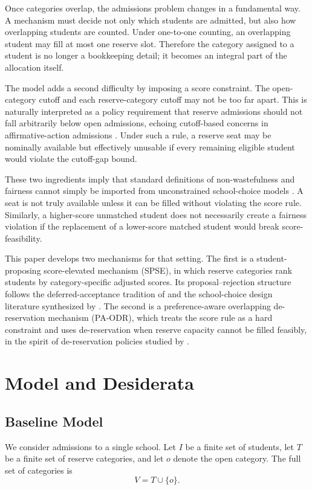 \documentclass[runningheads]{llncs}
\newcommand{\1}{\mathbf{1}}
\begin{document}
Once categories overlap, the admissions problem changes in a fundamental way. A mechanism must decide not only which students are admitted, but also how overlapping students are counted. Under one-to-one counting, an overlapping student may fill at most one reserve slot. Therefore the category assigned to a student is no longer a bookkeeping detail; it becomes an integral part of the allocation itself.

The model adds a second difficulty by imposing a score constraint. The open-category cutoff and each reserve-category cutoff may not be too far apart. This is naturally interpreted as a policy requirement that reserve admissions should not fall arbitrarily below open admissions, echoing cutoff-based concerns in affirmative-action admissions \cite{AyTu23a,ABB24a}. Under such a rule, a reserve seat may be nominally available but effectively unusable if every remaining eligible student would violate the cutoff-gap bound.

These two ingredients imply that standard definitions of non-wastefulness and fairness cannot simply be imported from unconstrained school-choice models \cite{EHYY14a,KHIY17a,GKK+17a}. A seat is not truly available unless it can be filled without violating the score rule. Similarly, a higher-score unmatched student does not necessarily create a fairness violation if the replacement of a lower-score matched student would break score-feasibility.

This paper develops two mechanisms for that setting. The first is a student-proposing score-elevated mechanism (SPSE), in which reserve categories rank students by category-specific adjusted scores. Its proposal--rejection structure follows the deferred-acceptance tradition of \cite{GaSh62a} and the school-choice design literature synthesized by \cite{AbSo03b,Roth08a}. The second is a preference-aware overlapping de-reservation mechanism (PA-ODR), which treats the score rule as a hard constraint and uses de-reservation when reserve capacity cannot be filled feasibly, in the spirit of de-reservation policies studied by \cite{AyTu23a}.


\section{Model and Desiderata}

\subsection{Baseline Model}
We consider admissions to a single school. Let $I$ be a finite set of students, let $T$ be a finite set of reserve categories, and let $o$ denote the open category. The full set of categories is
\[
V=T\cup\{o\}.
\]
\end{document}
